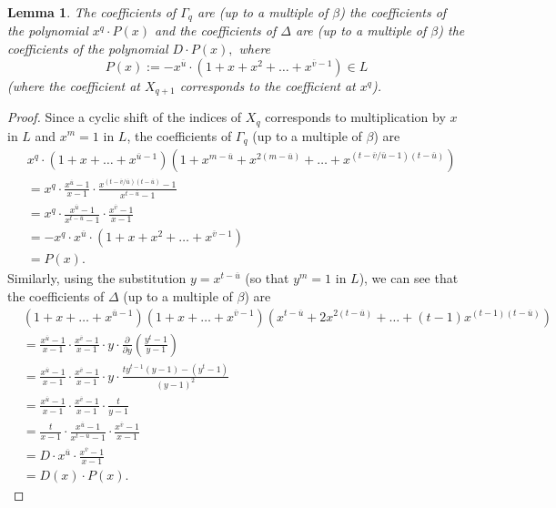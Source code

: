 \documentclass[12pt,a4paper]{article}
\newtheorem{lemma}[theorem]{Lemma}
\newcommand{\uo}{\overline{u}}
\newcommand{\vo}{\overline{v}}
\begin{document}
\begin{lemma}
The coefficients of $\Gamma_q$ are (up to a multiple of $\beta$) the coefficients of the polynomial $x^q\cdot P(x)$ and the coefficients of $\Delta$ are (up to a multiple of $\beta$) the coefficients of the polynomial $D\cdot P(x),$ where
$$P(x):=-x^{\uo}\cdot (1+x+x^2+\dots+x^{\vo-1})\in L$$
(where the coefficient at $X_{q+1}$ corresponds to the coefficient at $x^q$).
\end{lemma}
\begin{proof}
Since a cyclic shift of the indices of $X_q$ corresponds to multiplication by $x$ in $L$ and $x^m=1$ in $L$, the coefficients of $\Gamma_q$ (up to a multiple of $\beta$) are
\begin{equation*}\label{Gamma}
\begin{split}
&x^q\cdot(1+x+\dots+x^{\uo-1})(1+x^{m-\uo}+x^{2(m-\uo)}+\dots+x^{(t-\vo/\uo-1)(t-\uo)})\\
&=x^q\cdot\frac{x^{\uo}-1}{x-1}\cdot \frac{x^{(t-\vo/\uo)(t-\uo)}-1}{x^{t-\uo}-1}\\
&=x^q\cdot\frac{x^{\uo}-1}{x^{t-\uo}-1}\cdot \frac{x^{\vo}-1}{x-1}\\
&=-x^q\cdot x^{\uo}\cdot (1+x+x^2+\dots+x^{\vo-1})\\
&=P(x).
\end{split}
\end{equation*}
Similarly, using the substitution $y=x^{t-\uo}$ (so that $y^m=1$ in $L$), we can see that the coefficients of $\Delta$ (up to a multiple of $\beta$) are 
\begin{equation*}\label{Delta}
\begin{split}
&(1+x+\dots+x^{\uo-1})(1+x+\dots+x^{\vo-1})(x^{t-\uo}+2x^{2(t-\uo)}+\dots+(t-1)x^{(t-1)(t-\uo)})\\
&=\frac{x^{\uo}-1}{x-1}\cdot \frac{x^{\vo}-1}{x-1}\cdot y \cdot \frac{\partial}{\partial y} \left(\frac{y^{t}-1}{y-1}\right)\\
&=\frac{x^{\uo}-1}{x-1}\cdot \frac{x^{\vo}-1}{x-1}\cdot y \cdot \frac{ty^{t-1}(y-1)-(y^t-1)}{(y-1)^2}\\
&=\frac{x^{\uo}-1}{x-1}\cdot \frac{x^{\vo}-1}{x-1} \cdot \frac{t}{y-1}\\
&=\frac{t}{x-1}\cdot \frac{x^{\uo}-1}{x^{t-\uo}-1}\cdot \frac{x^{\vo}-1}{x-1}\\
&=D\cdot x^{\uo}\cdot\frac{x^{\vo}-1}{x-1}\\
&=D(x)\cdot P(x).
\end{split}
\end{equation*}
\end{proof}
\end{document}
